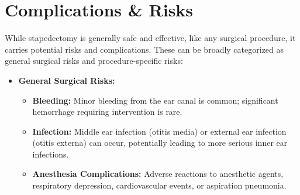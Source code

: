 \section*{Complications \& Risks}
While stapedectomy is generally safe and effective, like any surgical procedure, it carries potential risks and complications. These can be broadly categorized as general surgical risks and procedure-specific risks:

\begin{itemize}
  \item \textbf{General Surgical Risks:}
    \begin{itemize}
      \item \textbf{Bleeding:} Minor bleeding from the ear canal is common; significant hemorrhage requiring intervention is rare.
      \item \textbf{Infection:} Middle ear infection (otitis media) or external ear infection (otitis externa) can occur, potentially leading to more serious inner ear infections.
      \item \textbf{Anesthesia Complications:} Adverse reactions to anesthetic agents, respiratory depression, cardiovascular events, or aspiration pneumonia.
    \end{itemize}
  

\end{itemize}
